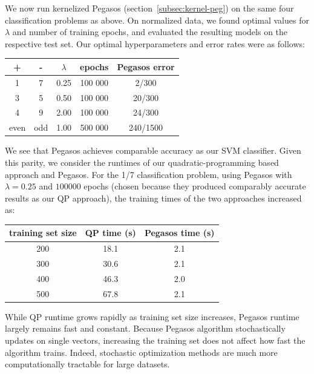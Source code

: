 \documentclass{article}
\begin{document}
\begin{multicols}{2}
We now run kernelized Pegasos (section~\ref{subsec:kernel-peg})
on the same four classification problems as above.
On normalized data,
we found optimal values for $\lambda$ and number of training epochs,
and evaluated the resulting models on the respective test set.
Our optimal hyperparameters and error rates were as follows: 
\begin{center} 
    \begin{tabular}{|c|c||c|c|c|}
        \hline
        + & - & $\lambda$ & epochs & Pegasos error \\\hline
        1 & 7 & 0.25 & 100 000 & 2/300 \\
        3 & 5 & 0.50 & 100 000 & 20/300\\
        4 & 9 & 2.00 & 100 000 & 24/300\\
        even & odd & 1.00 & 500 000 & 240/1500 \\\hline
    \end{tabular}
\end{center}

We see that Pegasos achieves comparable accuracy as our SVM classifier.
Given this parity, we consider the runtimes of
our quadratic-programming based approach and Pegasos.
For the 1/7 classification problem,
using Pegasos with $\lambda = 0.25$ and $100 000$ epochs
(chosen because they produced comparably accurate results as our QP approach),
the training times of the two approaches increased as:
\begin{center}
    \begin{tabular}{|c|c|c|}\hline
        training set size & QP time (s) & Pegasos time (s) \\\hline
        200 & 18.1 & 2.1\\
        300 & 30.6 & 2.1\\
        400 & 46.3 & 2.0\\
        500 & 67.8 & 2.1\\\hline
    \end{tabular}
\end{center}

While QP runtime grows rapidly as training set size increases,
Pegasos runtime largely remains fast and constant.
Because Pegasos algorithm stochastically updates on single vectors,
increasing the training set does not affect how fast the algorithm trains.
Indeed, stochastic optimization methods are
much more computationally tractable for large datasets.

\end{multicols}
\end{document}
